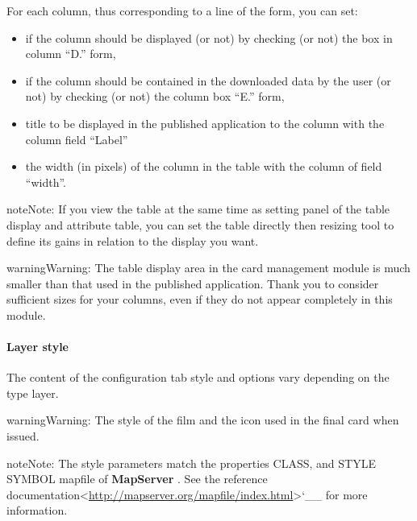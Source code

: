 \documentclass[letterpaper,10pt,english]{sphinxmanual}
\begin{document}
For each column, thus corresponding to a line of the form, you can set:
\begin{itemize}
\item {} 
if the column should be displayed (or not) by checking (or not) the box in column ``D.'' form,

\item {} 
if the column should be contained in the downloaded data by the user (or not) by checking (or not) the column box ``E.'' form,

\item {} 
title to be displayed in the published application to the column with the column field ``Label''

\item {} 
the width (in pixels) of the column in the table with the column of field ``width''.

\end{itemize}

\begin{notice}{note}{Note:}
If you view the table at the same time as setting panel of the table display and attribute table, you can set the table directly then resizing tool to define its gains in relation to the display you want.
\end{notice}

\begin{notice}{warning}{Warning:}
The table display area in the card management module is much smaller than that used in the published application. Thank you to consider sufficient sizes for your columns, even if they do not appear completely in this module.
\end{notice}


\paragraph{Layer style}
\label{maps/layerstree:style-d-une-couche}
The content of the configuration tab style and options vary depending on the type layer.

\begin{notice}{warning}{Warning:}
The style of the film and the icon used in the final card when issued.
\end{notice}

\begin{notice}{note}{Note:}
The style parameters match the properties CLASS, and STYLE SYMBOL mapfile of \textbf{MapServer} . See the reference documentation\textless{}\href{http://mapserver.org/mapfile/index.html}{http://mapserver.org/mapfile/index.html}\textgreater{}{}`\_\_ for more information.
\end{notice}
\end{document}
